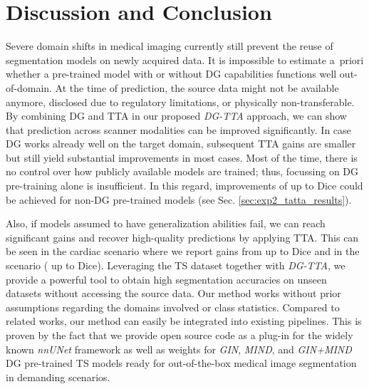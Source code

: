 \section{Discussion and Conclusion}
    Severe domain shifts in medical imaging currently still prevent the reuse of segmentation models on newly acquired data. It is impossible to estimate \mbox{a priori} whether a pre-trained model with or without DG capabilities functions well out-of-domain. At the time of prediction, the source data might not be available anymore, disclosed due to regulatory limitations, or physically non-transferable. By combining DG and TTA in our proposed \emph{DG-TTA} approach, we can show that prediction across scanner modalities can be improved significantly.
    In case DG works already well on the target domain, subsequent TTA gains are smaller but still yield substantial improvements in most cases. Most of the time, there is no control over how publicly available models are trained; thus, focussing on DG pre-training alone is insufficient. In this regard, improvements of up to  Dice could be achieved for non-DG pre-trained models (see Sec. \ref{sec:exp2_tatta_results}).

    Also, if models assumed to have generalization abilities fail, we can reach significant gains and recover high-quality predictions by applying TTA. This can be seen in the cardiac  scenario where we report gains from  up to  Dice and in the  scenario ( up to  Dice).
    Leveraging the TS dataset \citep{wasserthal2023totalsegmentator} together with \emph{DG-TTA}, we provide a powerful tool to obtain high segmentation accuracies on unseen datasets without accessing the source data.
    Our method works without prior assumptions regarding the domains involved or class statistics. Compared to related works, our method can easily be integrated into existing pipelines. This is proven by the fact that we provide open source code as a plug-in for the widely known \emph{nnUNet} framework as well as weights for \emph{GIN}, \emph{MIND}, and \emph{GIN+MIND} DG pre-trained TS models ready for out-of-the-box medical image segmentation in demanding scenarios.